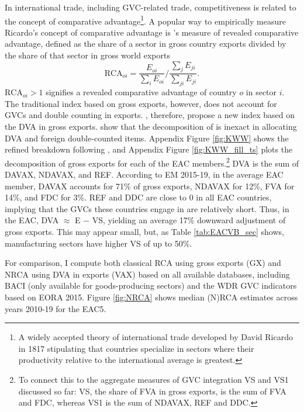 \documentclass[a4paper]{article}
\begin{document}
In international trade, including GVC-related trade, competitiveness is related to the concept of comparative advantage\footnote{A widely accepted theory of international trade developed by David Ricardo in 1817 stipulating that countries specialize in sectors where their productivity relative to the international average is greatest.}. 
A popular way to empirically measure Ricardo's concept of comparative advantage is \citet{balassa1965trade}'s measure of revealed comparative advantage, defined as the share of a sector in gross country exports divided by the share of that sector in gross world exports
%
\begin{equation}
\text{RCA}_{oi} = \frac{E_{oi}}{\sum_i E_{oi}} \Bigg/ \frac{\sum_j E_{ji}}{\sum_{ji} E_{ji}}.
\end{equation}
%
$\text{RCA}_{oi}>1$ signifies a revealed comparative advantage of country $o$ in sector $i$. The traditional index based on gross exports, however, does not account for GVCs and double counting in exports. \citet{koopman2014tracing}, therefore, propose a new index based on the DVA in gross exports. \citet{borin2019measuring} show that the decomposition of \citet{koopman2014tracing} is inexact in allocating DVA and foreign double-counted items. Appendix Figure \ref{fig:KWW} shows the refined breakdown following \citet{borin2019measuring}, and Appendix Figure \ref{fig:KWW_fill_ts} plots the decomposition of gross exports for each of the EAC members.\footnote{To connect this to the aggregate measures of GVC integration VS and VS1 discussed so far: VS, the share of FVA in gross exports, is the sum of FVA and FDC, whereas VS1 is the sum of NDAVAX, REF and DDC. \vspace{-5mm}} DVA is the sum of DAVAX, NDAVAX, and REF. According to EM 2015-19, in the average EAC member, DAVAX accounts for 71\% of gross exports, NDAVAX for 12\%, FVA for 14\%, and FDC for 3\%. REF and DDC are close to 0 in all EAC countries, implying that the GVCs these countries engage in are relatively short. Thus, in the EAC, DVA $\approx$ E $-$ VS, yielding an average 17\% downward adjustment of gross exports. This may appear small, but, as Table \ref{tab:EACVB_sec} shows, manufacturing sectors have higher VS of up to 50\%. \newline
 
For comparison, I compute both classical RCA using gross exports (GX) and NRCA using DVA in exports (VAX) based on all available databases, including BACI (only available for goods-producing sectors) and the WDR GVC indicators based on EORA 2015. Figure \ref{fig:NRCA} shows median (N)RCA estimates across years 2010-19 for the EAC5. 
\end{document}
